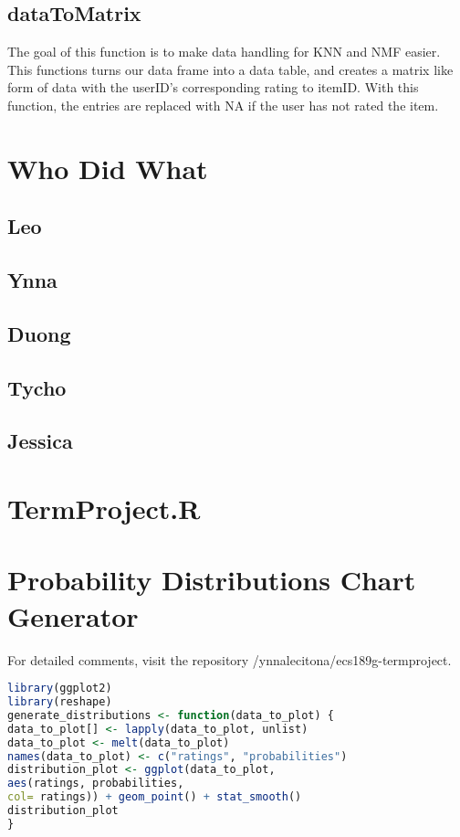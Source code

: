 \documentclass{article}
\begin{document}
\subsection{dataToMatrix} 
The goal of this function is to make data handling for KNN and NMF easier. This functions turns our data frame into a data table, and creates a matrix like form of data with the userID's corresponding rating to itemID. With this function, the entries are replaced with NA if the user has not rated the item. 

\section{Who Did What}
\subsection{Leo}

\subsection{Ynna}

\subsection{Duong}

\subsection{Tycho}

\subsection{Jessica}

\newpage
\appendix
\section{TermProject.R}

\section{Probability Distributions Chart Generator}
For detailed comments, visit the repository
/ynnalecitona/ecs189g-termproject.
\begin{lstlisting}[language=R]
library(ggplot2)
library(reshape)
generate_distributions <- function(data_to_plot) {
data_to_plot[] <- lapply(data_to_plot, unlist)
data_to_plot <- melt(data_to_plot)
names(data_to_plot) <- c("ratings", "probabilities")
distribution_plot <- ggplot(data_to_plot, 
aes(ratings, probabilities, 
col= ratings)) + geom_point() + stat_smooth()
distribution_plot
}
\end{lstlisting}
\end{document}
